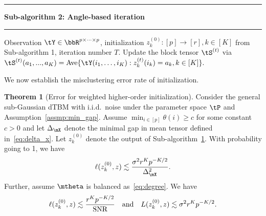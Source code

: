\documentclass[lettersize,onecolumn,journal]{IEEEtran}
\theoremstyle{definition}
\newtheorem{thm}{Theorem}
\theoremstyle{definition}
\newcommand\Algphase[1]{%
\vspace*{-.7\baselineskip}\Statex\hspace*{\dimexpr-\algorithmicindent-2pt\relax}\rule{\columnwidth}{0.4pt}%
\Statex\hspace*{-\algorithmicindent}\textbf{#1}%
\vspace*{-.7\baselineskip}\Statex\hspace*{\dimexpr-\algorithmicindent-2pt\relax}\rule{\columnwidth}{0.4pt}%
}
\begin{document}
\begin{algorithm}[h!]
\begin{algorithmic}[1]
\Algphase{Sub-algorithm 2: Angle-based iteration}\label{alg:2}
\INPUT Observation $\tY \in \bbR^{p \times \cdots \times p}$, initialization $z^{(0)}_k \colon [p]\to[r], k \in [K]$ from Sub-algorithm 1, iteration number $T$.
\State Update the block tensor $\tS^{(t)}$ via
$\tS^{(t)} (a_1,...,a_K)= \text{Ave} \{\tY(i_1,\ldots,i_K): z^{(t)}_k(i_k) = a_k, k \in [K]\}.$


\EndFor
\EndFor


\end{algorithmic}
\end{algorithm}

We now establish the misclustering error rate of initialization.
{
\color{blue}
\begin{thm}[Error for weighted higher-order initialization]\label{thm:initial} Consider the general sub-Gaussian dTBM with i.i.d.\ noise under the parameter space $\tP$ and Assumption~\ref{assmp:min_gap}. Assume $\min_{i\in[p]}\theta(i) \geq c$ for some constant $c>0$ and let $\Delta_{\mX}$ denote the minimal gap in mean tensor defined in~\eqref{eq:delta_x}.  Let $ z^{(0)}_k$ denote the output of Sub-algorithm~\hyperref[alg:main]{1}. With probability going to 1, we have
\begin{equation}
    \ell(z^{(0)}_k, z) \lesssim {\sigma^2 r^K p^{-K/2}\over \Delta_{\mX}^2}.
\end{equation}
Further, assume $\mtheta$ is balanced as~\eqref{eq:degree}. We have
\begin{equation}\label{eq:ini}
 \ell(z_k^{(0)}, z) \lesssim {r^K p^{-K/2}\over \text{SNR}} \quad \text{and} \quad L(z^{(0)}_k, z) \lesssim  {\sigma^2 r^K p^{-K/2}}.
\end{equation}
\end{thm}
}
\end{document}
